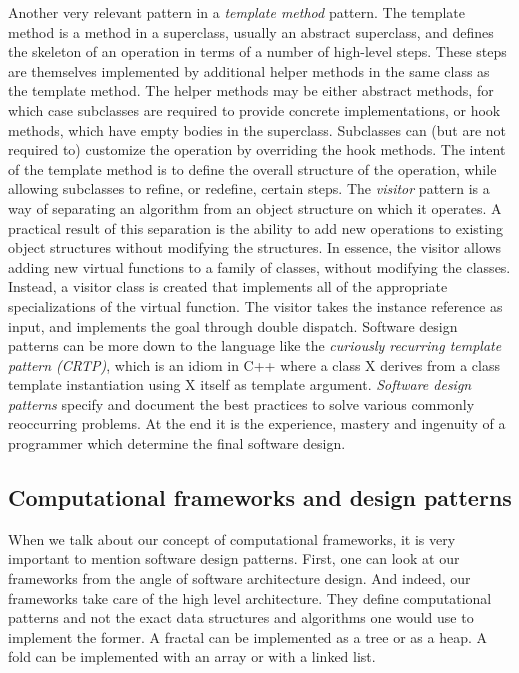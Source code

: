 \quad Another very relevant pattern in a \textit{template method} pattern. The template method is a method in a superclass, usually an abstract superclass, and defines the skeleton of an operation in terms of a number of high-level steps. These steps are themselves implemented by additional helper methods in the same class as the template method. The helper methods may be either abstract methods, for which case subclasses are required to provide concrete implementations, or hook methods, which have empty bodies in the superclass. Subclasses can (but are not required to) customize the operation by overriding the hook methods. The intent of the template method is to define the overall structure of the operation, while allowing subclasses to refine, or redefine, certain steps.\newline\null
\quad The \textit{visitor} pattern is a way of separating an algorithm from an object structure on which it operates. A practical result of this separation is the ability to add new operations to existing object structures without modifying the structures. In essence, the visitor allows adding new virtual functions to a family of classes, without modifying the classes. Instead, a visitor class is created that implements all of the appropriate specializations of the virtual function. The visitor takes the instance reference as input, and implements the goal through double dispatch.\newline\null
\quad Software design patterns can be more down to the language like the \textit{curiously recurring template pattern (CRTP)}, which is an idiom in C++ where a class X derives from a class template instantiation using X itself as template argument.\newline\null
\quad \textit{Software design patterns} specify and document the best practices to solve various commonly reoccurring problems. At the end it is the experience, mastery and ingenuity of a programmer which determine the final software design.  

\subsection{Computational frameworks and design patterns}
\label{background_design_frameworks}
\quad 






When we talk about our concept of computational frameworks, it is very important to mention software design patterns. First, one can look at our frameworks from the angle of software architecture design. And indeed, our frameworks take care of the high level architecture. They define computational patterns and not the exact data structures and algorithms one would use to implement the former. A fractal can be implemented as a tree or as a heap. A fold can be implemented with an array or with a linked list.    

